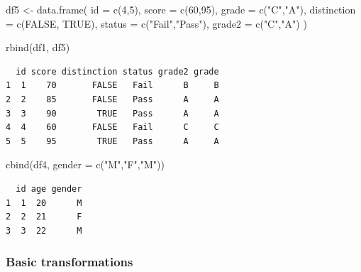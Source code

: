 \documentclass[
  letterpaper,
  DIV=11,
  numbers=noendperiod]{scrartcl}
\newenvironment{Shaded}{\begin{snugshade}}{\end{snugshade}}
\newcommand{\AttributeTok}[1]{\textcolor[rgb]{0.40,0.45,0.13}{#1}}
\newcommand{\ConstantTok}[1]{\textcolor[rgb]{0.56,0.35,0.01}{#1}}
\newcommand{\DecValTok}[1]{\textcolor[rgb]{0.68,0.00,0.00}{#1}}
\newcommand{\FunctionTok}[1]{\textcolor[rgb]{0.28,0.35,0.67}{#1}}
\newcommand{\NormalTok}[1]{\textcolor[rgb]{0.00,0.23,0.31}{#1}}
\newcommand{\OtherTok}[1]{\textcolor[rgb]{0.00,0.23,0.31}{#1}}
\newcommand{\SpecialCharTok}[1]{\textcolor[rgb]{0.37,0.37,0.37}{#1}}
\newcommand{\StringTok}[1]{\textcolor[rgb]{0.13,0.47,0.30}{#1}}
\begin{document}
\begin{Shaded}
\begin{Highlighting}[]
\NormalTok{df5 }\OtherTok{\textless{}{-}} \FunctionTok{data.frame}\NormalTok{(}
  \AttributeTok{id =} \FunctionTok{c}\NormalTok{(}\DecValTok{4}\NormalTok{,}\DecValTok{5}\NormalTok{),}
  \AttributeTok{score =} \FunctionTok{c}\NormalTok{(}\DecValTok{60}\NormalTok{,}\DecValTok{95}\NormalTok{),}
  \AttributeTok{grade =} \FunctionTok{c}\NormalTok{(}\StringTok{"C"}\NormalTok{,}\StringTok{"A"}\NormalTok{),}
  \AttributeTok{distinction =} \FunctionTok{c}\NormalTok{(}\ConstantTok{FALSE}\NormalTok{, }\ConstantTok{TRUE}\NormalTok{),}
  \AttributeTok{status =} \FunctionTok{c}\NormalTok{(}\StringTok{"Fail"}\NormalTok{,}\StringTok{"Pass"}\NormalTok{),}
  \AttributeTok{grade2 =} \FunctionTok{c}\NormalTok{(}\StringTok{"C"}\NormalTok{,}\StringTok{"A"}\NormalTok{)}
\NormalTok{)}

\FunctionTok{rbind}\NormalTok{(df1, df5)}
\end{Highlighting}
\end{Shaded}

\begin{verbatim}
  id score distinction status grade2 grade
1  1    70       FALSE   Fail      B     B
2  2    85       FALSE   Pass      A     A
3  3    90        TRUE   Pass      A     A
4  4    60       FALSE   Fail      C     C
5  5    95        TRUE   Pass      A     A
\end{verbatim}

\begin{Shaded}
\begin{Highlighting}[]
\FunctionTok{cbind}\NormalTok{(df4, }\AttributeTok{gender =} \FunctionTok{c}\NormalTok{(}\StringTok{"M"}\NormalTok{,}\StringTok{"F"}\NormalTok{,}\StringTok{"M"}\NormalTok{))}
\end{Highlighting}
\end{Shaded}

\begin{verbatim}
  id age gender
1  1  20      M
2  2  21      F
3  3  22      M
\end{verbatim}

\subsubsection{Basic transformations}\label{basic-transformations}

\begin{Shaded}
\end{Shaded}
\end{document}
